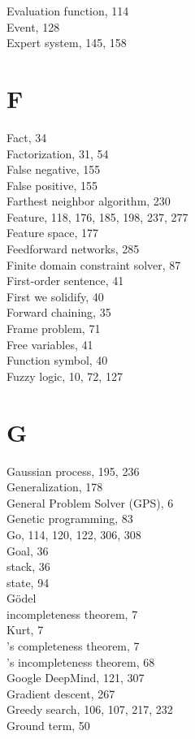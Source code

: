 \documentclass[10pt]{book}
\begin{document}
Evaluation function, 114\\
Event, 128\\
Expert system, 145, 158

\section*{F}
Fact, 34\\
Factorization, 31, 54\\
False negative, 155\\
False positive, 155\\
Farthest neighbor algorithm, 230\\
Feature, 118, 176, 185, 198, 237, 277\\
Feature space, 177\\
Feedforward networks, 285\\
Finite domain constraint solver, 87\\
First-order sentence, 41\\
First we solidify, 40\\
Forward chaining, 35\\
Frame problem, 71\\
Free variables, 41\\
Function symbol, 40\\
Fuzzy logic, 10, 72, 127

\section*{G}
Gaussian process, 195, 236\\
Generalization, 178\\
General Problem Solver (GPS), 6\\
Genetic programming, 83\\
Go, 114, 120, 122, 306, 308\\
Goal, 36\\
stack, 36\\
state, 94\\
Gödel\\
incompleteness theorem, 7\\
Kurt, 7\\
's completeness theorem, 7\\
's incompleteness theorem, 68\\
Google DeepMind, 121, 307\\
Gradient descent, 267\\
Greedy search, 106, 107, 217, 232\\
Ground term, 50
\end{document}
